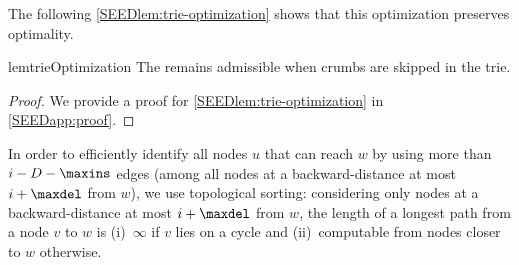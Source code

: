 The following \cref{SEEDlem:trie-optimization} shows that this optimization
preserves optimality.

\begin{restatable}{lem}{trieOptimization}
	\label{SEEDlem:trie-optimization}
	The \seedh remains admissible when crumbs are skipped in the trie.
\end{restatable}
\begin{proof}
	We provide a proof for \cref{SEEDlem:trie-optimization} in \cref{SEEDapp:proof}.
	\qedwhite
\end{proof}


In order to efficiently identify all nodes $u$ that can reach $w$ by using more
than $i-D-\maxins$ edges (among all nodes at a backward-distance at most
$i+\maxdel$ from $w$), we use topological sorting: considering only nodes at a
backward-distance at most $i+\maxdel$ from $w$, the length of a longest path
from a node $v$ to $w$ is (i)~$\infty$ if $v$ lies on a cycle and
(ii)~computable from nodes closer to $w$ otherwise.
